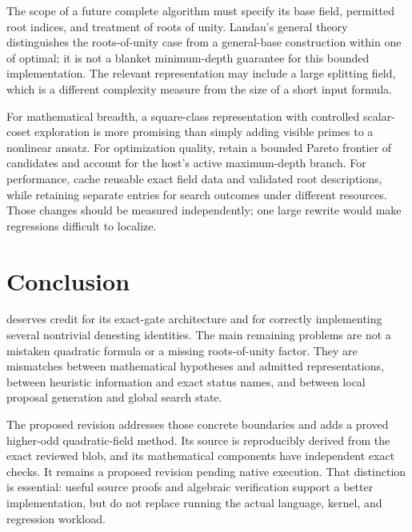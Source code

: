 \documentclass[11pt,a4paper]{article}
\newcommand{\code}[1]{\texttt{\detokenize{#1}}}
\theoremstyle{remark}\newtheorem{remark}[theorem]{Remark}
\begin{document}
The scope of a future complete algorithm must specify its base field, permitted root indices, and treatment of roots of unity. Landau's general theory distinguishes the roots-of-unity case from a general-base construction within one of optimal; it is not a blanket minimum-depth guarantee for this bounded implementation. The relevant representation may include a large splitting field, which is a different complexity measure from the size of a short input formula.\cite{landau,landauedited}

For mathematical breadth, a square-class representation with controlled scalar-coset exploration is more promising than simply adding visible primes to a nonlinear ansatz. For optimization quality, retain a bounded Pareto frontier of candidates and account for the host's active maximum-depth branch. For performance, cache reusable exact field data and validated root descriptions, while retaining separate entries for search outcomes under different resources. Those changes should be measured independently; one large rewrite would make regressions difficult to localize.

\section{Conclusion}
\code{StradFixed2.wl} deserves credit for its exact-gate architecture and for correctly implementing several nontrivial denesting identities. The main remaining problems are not a mistaken quadratic formula or a missing roots-of-unity factor. They are mismatches between mathematical hypotheses and admitted representations, between heuristic information and exact status names, and between local proposal generation and global search state.

The proposed revision addresses those concrete boundaries and adds a proved higher-odd quadratic-field method. Its source is reproducibly derived from the exact reviewed blob, and its mathematical components have independent exact checks. It remains a proposed revision pending native execution. That distinction is essential: useful source proofs and algebraic verification support a better implementation, but do not replace running the actual language, kernel, and regression workload.

\appendix
\end{document}
